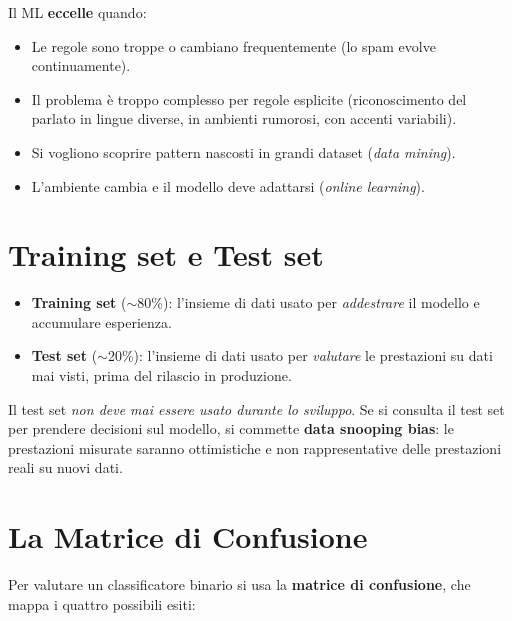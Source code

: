 Il ML \textbf{eccelle} quando:
\begin{itemize}
    \item Le regole sono troppe o cambiano frequentemente (lo spam evolve continuamente).
    \item Il problema è troppo complesso per regole esplicite (riconoscimento del parlato in lingue diverse, in ambienti rumorosi, con accenti variabili).
    \item Si vogliono scoprire pattern nascosti in grandi dataset (\emph{data mining}).
    \item L'ambiente cambia e il modello deve adattarsi (\emph{online learning}).
\end{itemize}

\section{Training set e Test set}
\begin{itemize}
    \item \textbf{Training set} ($\sim$80\%): l'insieme di dati usato per \emph{addestrare} il modello e accumulare esperienza.
    \item \textbf{Test set} ($\sim$20\%): l'insieme di dati usato per \emph{valutare} le prestazioni su dati mai visti, prima del rilascio in produzione.
\end{itemize}

\begin{warnbox}
Il test set \emph{non deve mai essere usato durante lo sviluppo}. Se si consulta il test set per prendere decisioni sul modello, si commette \textbf{data snooping bias}: le prestazioni misurate saranno ottimistiche e non rappresentative delle prestazioni reali su nuovi dati.
\end{warnbox}

\section{La Matrice di Confusione}
Per valutare un classificatore binario si usa la \textbf{matrice di confusione}, che mappa i quattro possibili esiti:

